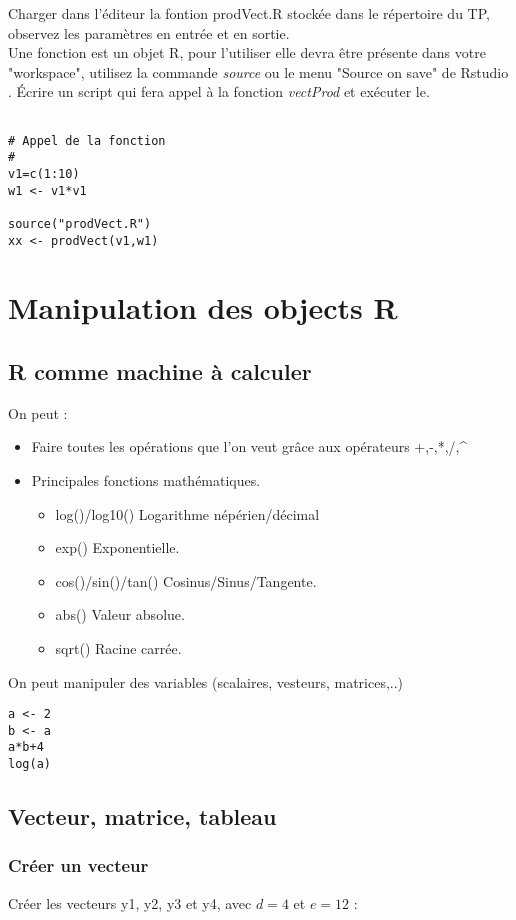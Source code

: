 \documentclass[12pt,twoside,openright]{article}
\begin{document}
Charger dans l'éditeur la fontion prodVect.R stockée dans le répertoire du TP, observez les paramètres en entrée et en sortie. \\

Une  fonction est un objet R, pour l'utiliser elle devra être présente dans votre "workspace", utilisez la commande \emph{source} ou le menu "Source on save" de Rstudio . \'Ecrire un script qui fera appel à la fonction  \emph{vectProd} et exécuter le.

\begin{verbatim}

# Appel de la fonction
#
v1=c(1:10)
w1 <- v1*v1

source("prodVect.R")
xx <- prodVect(v1,w1)

\end{verbatim}

\section{Manipulation des objects R}
\subsection{R comme machine à calculer}
On peut :
\begin{itemize}
\item Faire toutes les opérations que l'on veut grâce aux opérateurs +,-,*,/,\textasciicircum

\item Principales fonctions mathématiques.
\begin{itemize}
\item log()/log10() Logarithme népérien/décimal
\item exp() Exponentielle.
\item cos()/sin()/tan() Cosinus/Sinus/Tangente.
\item abs() Valeur absolue.
\item sqrt() Racine carrée.
\end{itemize}
\end{itemize}
%
On peut manipuler des variables (scalaires, vesteurs, matrices,..)
\begin{verbatim}
a <- 2
b <- a
a*b+4
log(a)

\end{verbatim}
%
\subsection{Vecteur, matrice, tableau}
\subsubsection{Créer un vecteur}
Créer les vecteurs  y1, y2, y3 et y4, avec $d = 4$ et $e = 12$ :
\end{document}

